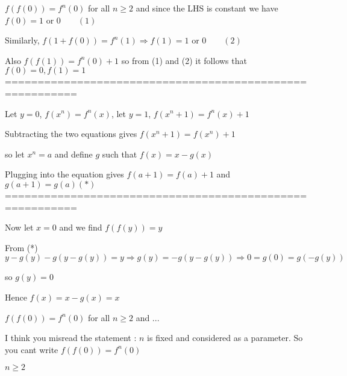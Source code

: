 \begin{solution}
	$ f(f(0))=f^n(0)$ for all $ n\ge 2$ and since the LHS is constant we have $ f(0) = 1$ or $ 0 \qquad(1)$

Similarly, $ f(1+f(0))=f^n(1) \Rightarrow f(1) = 1$ or $ 0 \qquad(2)$

Also $ f(f(1))=f^n(0) + 1$ so from (1) and (2) it follows that $ f(0)=0, f(1)=1$
=========================================================

Let $ y=0$, $ f(x^n)=f^n(x)$, let $ y=1$, $ f(x^n+1) = f^n(x) + 1$

Subtracting the two equations gives $ f(x^n+1) = f(x^n)+1$

so let $ x^n=a$ and define $ g$ such that $ f(x)=x-g(x)$ 

Plugging into the equation gives $ f(a+1)=f(a)+1$ and $ g(a+1)=g(a) (*)$
=========================================================

Now let $ x=0$ and we find $ f(f(y))=y$

From (*) $ y-g(y) - g(y-g(y)) = y \Longrightarrow g(y) = -g(y-g(y)) \Longrightarrow 0=g(0)=g(-g(y))$ 

so $ g(y)=0$

Hence $ f(x)=x-g(x) = x$
\end{solution}



\begin{solution}
	\begin{tcolorbox}$ f(f(0)) = f^n(0)$ for all $ n\ge 2$ and ...\end{tcolorbox}

I think you misread the statement : $ n$ is fixed and considered as a parameter. So you cant write $ f(f(0)) = f^n(0)$ $ n\ge 2$
\end{solution}



